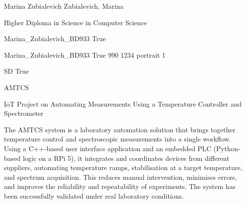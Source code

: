 \documentclass[twoside]{report}
\begin{document}
\begingroup{}\relax



\def\Key{Marina_Zubialevich_BD933}

{Marina Zubialevich}
{Zubialevich, Marina}

{Higher Diploma in Science in Computer Science}

{Marina_Zubialevich_BD933}
{True}

{Marina_Zubialevich_BD933}
{True}
{990}
{1234}
{portrait}
{1}

{SD}
{True}

{AMTCS}

{IoT Project on Automating Measurements Using a Temperature Controller and Spectrometer}

{The AMTCS system is a laboratory automation solution that brings together temperature control and spectroscopic measurements into a single workflow. Using a C++-based user interface application and an embedded PLC (Python-based logic on a RPi 5), it integrates and coordinates devices from different suppliers, automating temperature ramps, stabilisation at a target temperature, and spectrum acquisition. This reduces manual intervention, minimises errors, and improves the reliability and repeatability of experiments. The system has been successfully validated under real laboratory conditions.}
\end{document}
